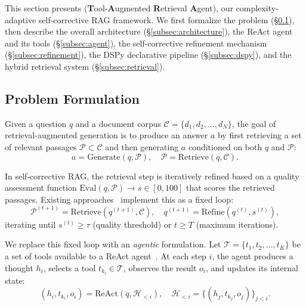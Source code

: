 
This section presents \ours{} (\textbf{T}ool-\textbf{A}ugmented \textbf{R}etrieval \textbf{A}gent), our complexity-adaptive self-corrective RAG framework.
We first formalize the problem (\S\ref{subsec:formulation}), then describe the overall architecture (\S\ref{subsec:architecture}), the ReAct agent and its tools (\S\ref{subsec:agent}), the self-corrective refinement mechanism (\S\ref{subsec:refinement}), the DSPy declarative pipeline (\S\ref{subsec:dspy}), and the hybrid retrieval system (\S\ref{subsec:retrieval}).

\subsection{Problem Formulation}
\label{subsec:formulation}

Given a question $q$ and a document corpus $\mathcal{C} = \{d_1, d_2, \ldots, d_N\}$, the goal of retrieval-augmented generation is to produce an answer $a$ by first retrieving a set of relevant passages $\mathcal{P} \subset \mathcal{C}$ and then generating $a$ conditioned on both $q$ and $\mathcal{P}$:
\begin{equation}
    a = \text{Generate}(q, \mathcal{P}), \quad \mathcal{P} = \text{Retrieve}(q, \mathcal{C}).
    \label{eq:rag}
\end{equation}

In self-corrective RAG, the retrieval step is iteratively refined based on a quality assessment function $\text{Eval}(q, \mathcal{P}) \rightarrow s \in [0, 100]$ that scores the retrieved passages.
Existing approaches~\cite{yan2024crag} implement this as a fixed loop:
\begin{equation}
    \mathcal{P}^{(t+1)} = \text{Retrieve}(q^{(t+1)}, \mathcal{C}), \quad q^{(t+1)} = \text{Refine}(q^{(t)}, s^{(t)}),
    \label{eq:loop}
\end{equation}
iterating until $s^{(t)} \geq \tau$ (quality threshold) or $t \geq T$ (maximum iterations).

We replace this fixed loop with an \emph{agentic} formulation.
Let $\mathcal{T} = \{t_1, t_2, \ldots, t_K\}$ be a set of tools available to a ReAct agent~\cite{yao2023react}.
At each step $i$, the agent produces a thought $h_i$, selects a tool $t_{k_i} \in \mathcal{T}$, observes the result $o_i$, and updates its internal state:
\begin{equation}
    (h_i, t_{k_i}, o_i) = \text{ReAct}(q, \mathcal{H}_{<i}), \quad \mathcal{H}_{<i} = \{(h_j, t_{k_j}, o_j)\}_{j<i}.
    \label{eq:react}
\end{equation}

